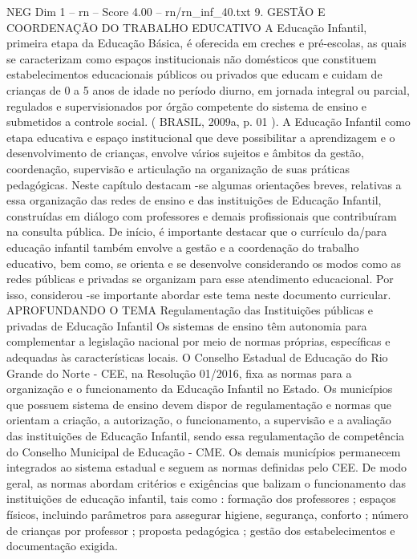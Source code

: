 \begin{textsample}{NEG Dim 1 – rn – Score 4.00 – rn/rn\_inf\_40.txt}  \label{ex:f1_neg_029}
9.
GESTÃO E COORDENAÇÃO DO TRABALHO EDUCATIVO A Educação Infantil, primeira etapa da Educação Básica, é oferecida em creches e pré-escolas, as quais se caracterizam como espaços institucionais não domésticos que constituem estabelecimentos educacionais públicos ou privados que educam e cuidam de crianças de 0 a 5 anos de idade no período diurno, em jornada integral ou parcial, regulados e supervisionados por órgão competente do sistema de ensino e submetidos a controle social. ( BRASIL, 2009a, p. 01 ).
A Educação Infantil como etapa educativa e espaço institucional que deve possibilitar a aprendizagem e o desenvolvimento de crianças, envolve vários sujeitos e âmbitos da gestão, coordenação, supervisão e articulação na organização de suas práticas pedagógicas.
Neste capítulo destacam -se algumas orientações breves, relativas a essa organização das redes de ensino e das instituições de Educação Infantil, construídas em diálogo com professores e demais profissionais que contribuíram na consulta pública.
De início, é importante destacar que o currículo da/para educação infantil também envolve a gestão e a coordenação do trabalho educativo, bem como, se orienta e se desenvolve considerando os modos como as redes públicas e privadas se organizam para esse atendimento educacional.
Por isso, considerou -se importante abordar este tema neste documento curricular.
APROFUNDANDO O TEMA Regulamentação das Instituições públicas e privadas de Educação Infantil Os sistemas de ensino têm autonomia para complementar a legislação nacional por meio de normas próprias, específicas e adequadas às características locais.
O Conselho Estadual de Educação do Rio Grande do Norte - CEE, na Resolução 01/2016, fixa as normas para a organização e o funcionamento da Educação Infantil no Estado.
Os municípios que possuem sistema de ensino devem dispor de regulamentação e normas que orientam a criação, a autorização, o funcionamento, a supervisão e a avaliação das instituições de Educação Infantil, sendo essa regulamentação de competência do Conselho Municipal de Educação - CME.
Os demais municípios permanecem integrados ao sistema estadual e seguem as normas definidas pelo CEE.
De modo geral, as normas abordam critérios e exigências que balizam o funcionamento das instituições de educação infantil, tais como : formação dos professores ; espaços físicos, incluindo parâmetros para assegurar higiene, segurança, conforto ; número de crianças por professor ; proposta pedagógica ; gestão dos estabelecimentos e documentação exigida.

\end{textsample}
